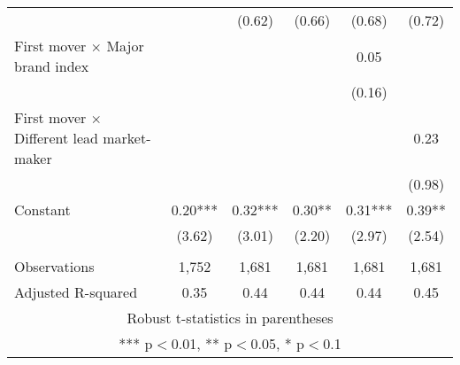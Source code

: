 \documentclass[]{article}
\begin{document}
\begin{tabular}{lccccc}
 &  & (0.62) & (0.66) & (0.68) & (0.72) \\
First mover $\times$ Major brand index &  &  &  & 0.05 &  \\
 &  &  &  & (0.16) &  \\
First mover $\times$ Different lead market-maker &  &  &  &  & 0.23 \\
 &  &  &  &  & (0.98) \\
Constant & 0.20*** & 0.32*** & 0.30** & 0.31*** & 0.39** \\
 & (3.62) & (3.01) & (2.20) & (2.97) & (2.54) \\
 &  &  &  &  &  \\
Observations & 1,752 & 1,681 & 1,681 & 1,681 & 1,681 \\
 Adjusted R-squared & 0.35 & 0.44 & 0.44 & 0.44 & 0.45 \\ \hline
\multicolumn{6}{c}{ Robust t-statistics in parentheses} \\
\multicolumn{6}{c}{ *** p$<$0.01, ** p$<$0.05, * p$<$0.1} \\
\end{tabular}
\end{document}
